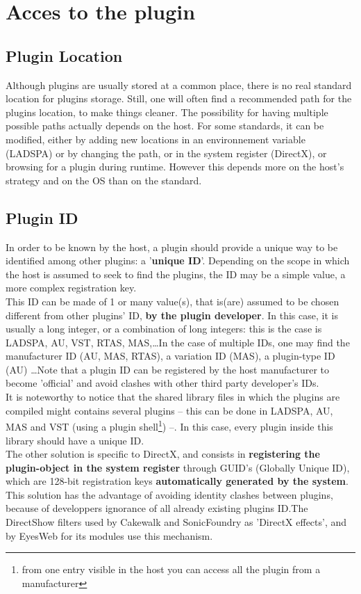\section{Acces to the plugin}

\subsection{Plugin Location}
\noindent Although plugins are usually stored at a common place, there is no real standard location for plugins storage. Still, one will often find a recommended path for the plugins location, to make things cleaner. The possibility for having multiple possible paths actually depends on the host. For some standards, it can be modified, either by adding new locations in an environnement variable (LADSPA) or by changing the path, or in the system register (DirectX), or browsing for a plugin during runtime. However this depends more on the host's strategy and on the OS than on the standard.

\subsection{Plugin ID}
In order to be known by the host, a plugin should provide a unique way to be identified among other plugins: a '{\bf unique ID}'. Depending on the scope in which the host is assumed to seek to find the plugins, the ID may be a simple value, a more complex registration key.\\
This ID can be made of 1 or many value(s), that is(are) assumed to be chosen different from other plugins' ID, {\bf by the plugin developer}. In this case, it is usually a long integer, or a combination of long integers: this is the case is LADSPA, AU, VST, RTAS, MAS,\ldots In the case of multiple IDs, one may find the manufacturer ID (AU, MAS, RTAS), a variation ID (MAS), a plugin-type ID (AU) \ldots Note that a plugin ID can be registered by the host manufacturer to become 'official' and avoid clashes with other third party developer's IDs.\\
It is noteworthy to notice that the shared library files in which the plugins are compiled might contains several plugins -- this can be done in LADSPA, AU, MAS and VST (using a plugin shell\footnote{from one entry visible in the host you can access all the plugin from a manufacturer}) --. In this case, every plugin inside this library should have a unique ID.\\
The other solution is specific to DirectX, and consists in {\bf registering the plugin-object in the system register} through GUID's (Globally Unique ID), which are 128-bit registration keys {\bf automatically generated by the system}.
This solution has the advantage of avoiding identity clashes between plugins, because of developpers ignorance of all already existing plugins ID.The DirectShow filters used by Cakewalk and SonicFoundry as 'DirectX effects', and by EyesWeb for its modules use this mechanism.


